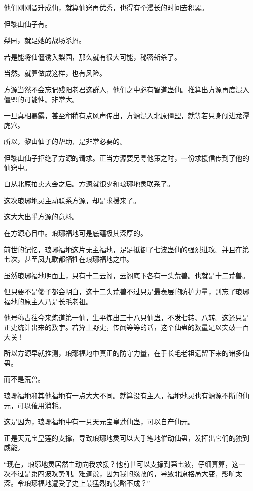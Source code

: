 \begin{this_body}
他们刚刚晋升成仙，就算仙窍再优秀，也得有个漫长的时间去积累。

但黎山仙子有。

梨园，就是她的战场杀招。

若是能将仙僵诱入梨园，那么就有很大可能，秘密斩杀了。

当然。就算做成这样，也有风险。

方源当然不会忘记残阳老君这群人，他们之中必有智道蛊仙。推算出方源再度混入僵盟的可能性。非常大。

一旦真相暴露，甚至稍稍有点风声传出，方源混入北原僵盟，就等若只身闯进龙潭虎穴。

所以，黎山仙子的帮助，是非常必要的。

但黎山仙子拒绝了方源的请求。正当方源要另寻他策之时，一份求援信传到了他的仙窍中。

自从北原拍卖大会之后。方源就很少和琅琊地灵联系了。

这次琅琊地灵主动联系方源，却是求援来了。

这大大出乎方源的意料。

在方源心目中。琅琊福地可是底蕴极其深厚的。

前世的记忆，琅琊福地这片无主福地，足足抵御了七波蛊仙的强烈进攻。并且在第七次，甚至凤九歌都牺牲在琅琊福地之中。

虽然琅琊福地明面上，只有十二云阁，云阁底下各有一头荒兽。也就是十二荒兽。

但只要不是傻子都会明白，这十二头荒兽不过只是最表层的防护力量，别忘了琅琊福地的原主人乃是长毛老祖。

他号称古往今来炼道第一仙，生平炼出三十八只仙蛊，不发七转、八转。这还只是正史统计出来的数字。若算上野史，传闻等等的话，这个仙蛊的数量足以突破一百大关！

所以方源早就推测，琅琊福地中真正的防守力量，在于长毛老祖遗留下来的诸多仙蛊。

而不是荒兽。

琅琊福地和其他福地有一点大大不同。就算没有主人，福地地灵也有源源不断的仙元，可以催用消耗。

这是因为，琅琊福地中有一只天元宝皇莲仙蛊，可以自产仙元。

正是天元宝皇莲的支撑，导致琅琊地灵可以大手笔地催动仙蛊，发挥出它们的独到威能。

“现在，琅琊地灵居然主动向我求援？他前世可以支撑到第七波，仔细算算，这一次不过是第四波攻势吧。难道说，因为我的缘故的，导致北原格局大变，影响太深。令琅琊福地遭受了史上最猛烈的侵略不成？”


\end{this_body}
